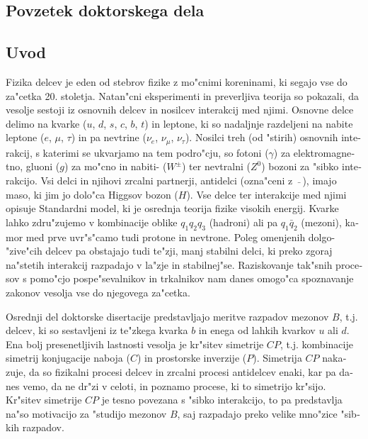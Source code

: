 \begin{otherlanguage}{slovene}
\chapter{Povzetek doktorskega dela}
\section{Uvod}
Fizika delcev je eden od stebrov fizike z mo"cnimi koreninami, ki segajo vse do za"cetka 20. stoletja. Natan"cni eksperimenti in preverljiva teorija so pokazali, da vesolje sestoji iz osnovnih delcev in nosilcev interakcij med njimi. Osnovne delce delimo na kvarke ($u$, $d$, $s$, $c$, $b$, $t$) in leptone, ki so nadaljnje razdeljeni na nabite leptone ($e$, $\mu$, $\tau$) in pa nevtrine ($\nu_e$, $\nu_\mu$, $\nu_\tau$). Nosilci treh (od "stirih) osnovnih interakcij, s katerimi se ukvarjamo na tem podro"cju, so fotoni ($\gamma$) za elektromagnetno, gluoni ($g$) za mo"cno in nabiti- ($W^\pm$) ter nevtralni ($Z^0$) bozoni za "sibko interakcijo. Vsi delci in njihovi zrcalni partnerji, antidelci (ozna"ceni z $~\bar {}~$), imajo maso, ki jim jo dolo"ca Higgsov bozon ($H$). Vse delce ter interakcije med njimi opisuje Standardni model, ki je osrednja teorija fizike visokih energij. Kvarke lahko zdru"zujemo v kombinacije oblike $q_1 q_2 q_3$ (hadroni) ali pa $q_1 \bar{q}_2$ (mezoni), kamor med prve uvr"s"camo tudi protone in nevtrone. Poleg omenjenih dolgo-"zive"cih delcev pa obstajajo tudi te"zji, manj stabilni delci, ki preko zgoraj na"stetih interakcij razpadajo v la"zje in stabilnej"se. Raziskovanje tak"snih procesov s pomo"cjo pospe"sevalnikov in trkalnikov nam danes omogo"ca spoznavanje zakonov vesolja vse do njegovega za"cetka.

Osrednji del doktorske disertacije predstavljajo meritve razpadov mezonov $B$, t.j. delcev, ki so sestavljeni iz te"zkega kvarka $b$ in enega od lahkih kvarkov $u$ ali $d$. Ena bolj presenetljivih lastnosti vesolja je kr"sitev simetrije $CP$, t.j. kombinacije simetrij konjugacije naboja ($C$) in prostorske inverzije ($P$). Simetrija $CP$ nakazuje, da so fizikalni procesi delcev in zrcalni procesi antidelcev enaki, kar pa danes vemo, da ne dr"zi v celoti, in poznamo procese, ki to simetrijo kr"sijo. Kr"sitev simetrije $CP$ je tesno povezana s "sibko interakcijo, to pa predstavlja na"so motivacijo za "studijo mezonov $B$, saj razpadajo preko velike mno"zice "sibkih razpadov.


\end{otherlanguage}
